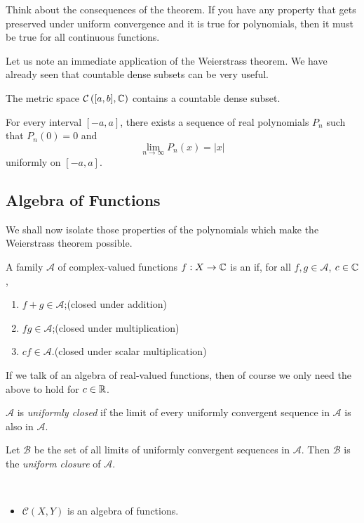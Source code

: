 Think about the consequences of the theorem. If you have any property that gets preserved under uniform convergence and it is true for polynomials, then it must be true for all continuous functions.

Let us note an immediate application of the Weierstrass theorem. We have already seen that countable dense subsets can be very useful.

\begin{corollary}
The metric space $\mathcal{C}\left([a,b],\mathbb C\right)$ contains a countable dense subset.
\end{corollary}

\begin{corollary}
For every interval $[-a,a]$, there exists a sequence of real polynomials $P_n$ such that $P_n(0)=0$ and
\[\lim_{n\to\infty}P_n(x)=|x|\]
uniformly on $[-a,a]$.
\end{corollary}

\subsection{Algebra of Functions}
We shall now isolate those properties of the polynomials which make the Weierstrass theorem possible.

\begin{definition}
A family $\mathscr{A}$ of complex-valued functions $f:X\to\mathbb C$ is an  if, for all $f,g\in\mathscr{A}$, $c\in\mathbb C$,
\begin{enumerate}[label=(\roman*)]
\item $f+g\in\mathscr{A}$;\hfill(closed under addition)
\item $fg\in\mathscr{A}$;\hfill(closed under multiplication)
\item $cf\in\mathscr{A}$.\hfill(closed under scalar multiplication)
\end{enumerate}
If we talk of an algebra of real-valued functions, then of course we only need the above to hold for $c\in\mathbb R$.

$\mathscr{A}$ is \emph{uniformly closed} if the limit of every uniformly convergent sequence in $\mathscr{A}$ is also in $\mathscr{A}$.

Let $\mathscr{B}$ be the set of all limits of uniformly convergent sequences in $\mathscr{A}$. Then $\mathscr{B}$ is the \emph{uniform closure} of $\mathscr{A}$.
\end{definition}

\begin{example} \
\begin{itemize}
\item $\mathcal{C}(X,Y)$ is an algebra of functions.
\end{itemize}
\end{example}

